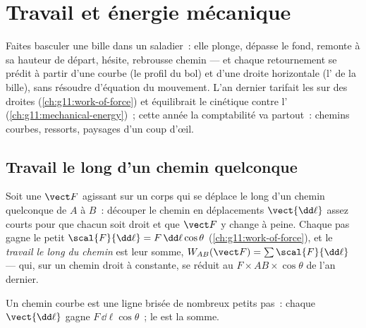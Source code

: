 \chapter{Travail et énergie mécanique}\label{ch:g12:work-and-energy}

Faites basculer une bille dans un saladier~: elle plonge, dépasse le
fond, remonte à sa hauteur de départ, hésite, rebrousse chemin --- et
chaque retournement se prédit à partir d'une courbe (le profil du
bol) et d'une droite horizontale (l' de la bille), sans
résoudre d'équation du mouvement. L'an dernier tarifait les
 sur des droites (\cref{ch:g11:work-of-force}) et
équilibrait le cinétique contre l'
(\cref{ch:g11:mechanical-energy})~; cette année la comptabilité va
partout~: chemins courbes, ressorts, paysages d'un coup d'œil.

\section{Travail le long d'un chemin quelconque}

\begin{definition}\label{def:g12:work-and-energy:path}
Soit une  $\vect F$ agissant sur un corps qui se déplace le
long d'un chemin quelconque de $A$ à $B$~: découper le chemin en
déplacements $\vect{\dd\ell}$ assez courts pour que chacun soit droit
et que $\vect F$ y change à peine. Chaque pas gagne le petit
 $\scal{F}{\dd\ell} = F\,\dd\ell\cos\theta$
(\cref{ch:g11:work-of-force}), et le
\emph{travail le long du chemin} est leur somme, $W_{AB}(\vect F) = \sum
\scal{F}{\dd\ell}$ --- qui, sur un chemin droit à 
constante, se réduit au $F \times AB \times \cos\theta$ de l'an
dernier.
\end{definition}

\begin{omfigure}

{\small Un chemin courbe est une ligne brisée de nombreux petits
pas~: chaque $\vect{\dd\ell}$ gagne $F\,\dd\ell\cos\theta$~; le
 est la somme.}
\end{omfigure}

